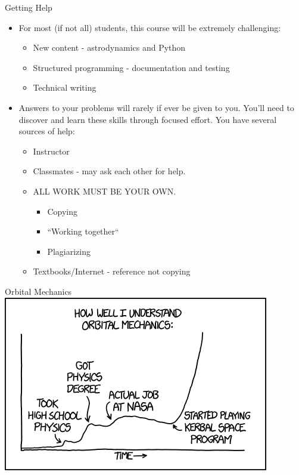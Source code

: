 \documentclass[11pt,professionalfonts]{beamer}
\begin{document}
\begin{frame}{Getting Help}
    \begin{itemize}
        \item For most (if not all) students, this course will be extremely challenging:
            \begin{itemize}
                \item New content - astrodynamics and Python
                \item Structured programming - documentation and testing
                \item Technical writing 
            \end{itemize}
            \pause
        \item Answers to your problems will rarely if ever be given to you. 
            You'll need to discover and learn these skills through focused effort.
            You have several sources of help:
            \begin{itemize}
                \item Instructor
                \item Classmates - may ask each other for help.
                \item ALL WORK MUST BE YOUR OWN.
                    \begin{itemize}
                        \item Copying
                        \item ``Working together``
                        \item Plagiarizing
                    \end{itemize}
                \item Textbooks/Internet - reference not copying
            \end{itemize}
    \end{itemize}
\end{frame}

\begin{frame}{Orbital Mechanics}
    \centering
    \includegraphics[height=\textheight,width=\textwidth,keepaspectratio]{figures/orbital_mechanics_xkcd.png}
\end{frame}
\end{document}
